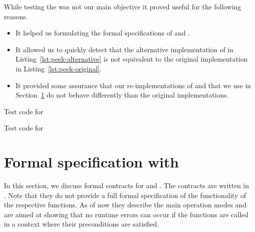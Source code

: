While testing the \bitwalker was not our main objective it proved useful for
the following reasons.

\begin{itemize}
\item It helped us formulating the formal specifications of \peek and \poke.
  
\item It allowed us to quickly detect that the alternative implementation of
      \peek in Listing~\ref{lst:peek-alternative} is not equivalent to the
      original implementation in Listing~\ref{lst:peek-original}.

\item It provided some assurance that our re-implementations of \peek and \poke
      that we use in Section~\ref{sec:formal-specification} do not behave differently
      than the original implementations.
\end{itemize}

\clearpage

\begin{listing}[hbt]
\begin{minipage}{\textwidth}

\end{minipage}
\caption{\label{lst:test_peek} Test code for \peek}
\end{listing}

\clearpage

\begin{listing}[hbt]
\begin{minipage}{\textwidth}

\end{minipage}
\caption{\label{lst:test_poke} Test code for \poke}
\end{listing}

\clearpage

\section{Formal specification with \acsl}
\label{sec:formal-specification}

In this section, we discuss formal contracts for \peek and \poke.
The contracts are written in \acsl.
Note that they do not provide a full formal specification
of the functionality of the respective functions.
As of now they describe the main operation modes and are aimed at showing
that no runtime errors can occur if the functions are called 
in a context where their preconditions are satisfied.

